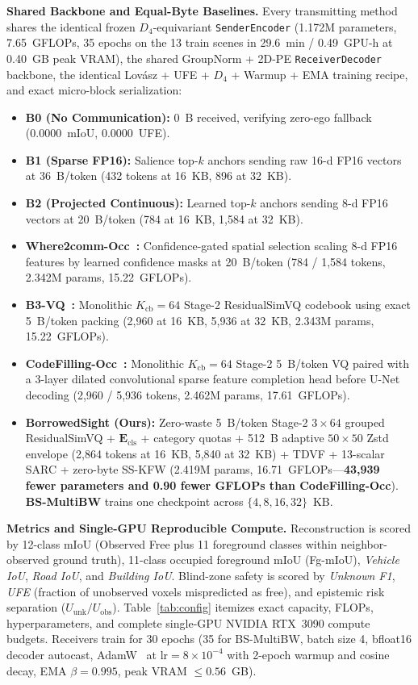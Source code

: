 \documentclass[journal]{IEEEtran}
\begin{document}
\textbf{Shared Backbone and Equal-Byte Baselines.} Every transmitting method shares the identical frozen $D_4$-equivariant \texttt{SenderEncoder} (1.172M parameters, 7.65~GFLOPs, 35 epochs on the 13 train scenes in 29.6~min / 0.49~GPU-h at 0.40~GB peak VRAM), the shared GroupNorm + 2D-PE \texttt{ReceiverDecoder} backbone, the identical Lov\'asz + UFE + $D_4$ + Warmup + EMA training recipe, and exact micro-block serialization:
\begin{itemize}
\item \textbf{B0 (No Communication):} 0~B received, verifying zero-ego fallback (0.0000~mIoU, 0.0000~UFE).
\item \textbf{B1 (Sparse FP16):} Salience top-$k$ anchors sending raw 16-d FP16 vectors at 36~B/token (432 tokens at 16~KB, 896 at 32~KB).
\item \textbf{B2 (Projected Continuous):} Learned top-$k$ anchors sending 8-d FP16 vectors at 20~B/token (784 at 16~KB, 1,584 at 32~KB).
\item \textbf{Where2comm-Occ~\cite{hu2022where2comm}:} Confidence-gated spatial selection scaling 8-d FP16 features by learned confidence masks at 20~B/token (784 / 1,584 tokens, 2.342M params, 15.22~GFLOPs).
\item \textbf{B3-VQ~\cite{li2026vqsop}:} Monolithic $K_{\mathrm{cb}} = 64$ Stage-2 ResidualSimVQ codebook using exact 5~B/token packing (2,960 at 16~KB, 5,936 at 32~KB, 2.343M params, 15.22~GFLOPs).
\item \textbf{CodeFilling-Occ~\cite{hu2024codefilling}:} Monolithic $K_{\mathrm{cb}} = 64$ Stage-2 5~B/token VQ paired with a 3-layer dilated convolutional sparse feature completion head before U-Net decoding (2,960 / 5,936 tokens, 2.462M params, 17.61~GFLOPs).
\item \textbf{BorrowedSight (Ours):} Zero-waste 5~B/token Stage-2 $3\times 64$ grouped ResidualSimVQ + $\mathbf{E}_{\mathrm{cls}}$ + category quotas + 512~B adaptive $50\times 50$ Zstd envelope (2,864 tokens at 16~KB, 5,840 at 32~KB) + TDVF + 13-scalar SARC + zero-byte SS-KFW (2.419M params, 16.71~GFLOPs---\textbf{43,939 fewer parameters and 0.90 fewer GFLOPs than CodeFilling-Occ}). \textbf{BS-MultiBW} trains one checkpoint across $\{4, 8, 16, 32\}$~KB.
\end{itemize}

\textbf{Metrics and Single-GPU Reproducible Compute.} Reconstruction is scored by 12-class mIoU (Observed Free plus 11 foreground classes within neighbor-observed ground truth), 11-class occupied foreground mIoU (Fg-mIoU), \textit{Vehicle IoU}, \textit{Road IoU}, and \textit{Building IoU}. Blind-zone safety is scored by \textit{Unknown F1}, \textit{UFE} (fraction of unobserved voxels mispredicted as free), and epistemic risk separation ($U_{\mathrm{unk}} / U_{\mathrm{obs}}$). Table~\ref{tab:config} itemizes exact capacity, FLOPs, hyperparameters, and complete single-GPU NVIDIA RTX~3090 compute budgets. Receivers train for 30 epochs (35 for BS-MultiBW, batch size 4, bfloat16 decoder autocast, AdamW~\cite{loshchilov2019adamw} at $\mathrm{lr} = 8\times 10^{-4}$ with 2-epoch warmup and cosine decay, EMA $\beta = 0.995$, peak VRAM $\le 0.56$~GB).
\end{document}

